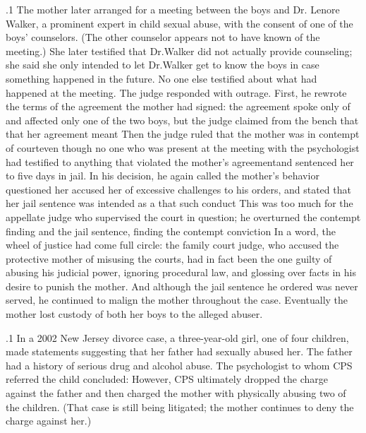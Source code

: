 \documentclass[11pt, twoside]{article}
\begin{document}
{\p.1{%
The mother later arranged for a meeting between the boys and Dr.\@
Lenore Walker, a prominent expert in child sexual abuse, with the consent of one of the boys’ counselors. (The other counselor appears not to
have known of the meeting.) She later testified that Dr.\@ Walker did not
actually provide counseling; she said she only intended to let Dr.\@ Walker
get to know the boys in case something happened in the future. No one
else testified about what had happened at the meeting.
The judge responded with outrage. First, he rewrote the terms of the
agreement the mother had signed: the agreement spoke only of  and affected only one of the two boys, but the judge claimed
from the bench that that her agreement meant  Then
the judge ruled that the mother was in contempt of court\mdash{}even though
no one who was present at the meeting with the psychologist had testified to anything that violated the mother’s agreement\mdash{}and sentenced
her to five days in jail. In his decision, he again called the mother’s behavior  questioned her  accused
her of excessive challenges to his orders, and stated that her jail sentence was intended as a  that such conduct  This was too much for the appellate judge who supervised the court in question; he overturned the contempt finding and
the jail sentence, finding the contempt conviction  In a word, the wheel of justice had come
full circle: the family court judge, who accused the protective mother
of misusing the courts, had in fact been the one guilty of abusing his
judicial power, ignoring procedural law, and glossing over facts in his
desire to punish the mother. And although the jail sentence he ordered
was never served, he continued to malign the mother throughout the
case. Eventually the mother lost custody of both her boys to the alleged
abuser.
}%

\p.1{%
In a 2002 New Jersey divorce case, a three-year-old girl, one of
four children, made statements suggesting that her father had sexually
abused her. The father had a history of serious drug and alcohol abuse.
The psychologist to whom CPS referred the child concluded:  However, CPS ultimately dropped the charge against the father
and then charged the mother with physically abusing two of the children. (That case is still being litigated; the mother continues to deny the
charge against her.)
}%

}
\end{document}
